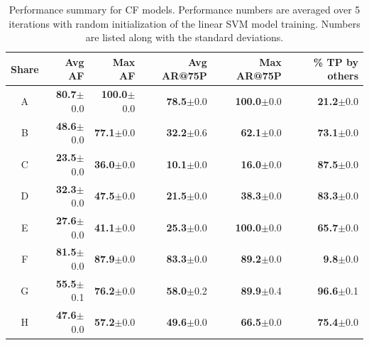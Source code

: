 \begin{table}[t!]
{\fontsize{8pt}{1em}\selectfont
\begin{center}
\caption{Performance summary for CF models. Performance
  numbers are averaged over 5 iterations with random
  initialization of the linear SVM model training. Numbers are listed
  along with the standard deviations.}
\begin{tabular}{|c|r|r|r|r|r|}
		\hline
		\textbf{Share} & \textbf{Avg AF} & \textbf{Max AF} & \textbf{Avg AR@75P} & \textbf{Max AR@75P} & \textbf{\% TP by others} \tabularnewline
		\hline
A&\textbf{80.7}$\pm$0.0&\textbf{100.0}$\pm$0.0&\textbf{78.5}$\pm$0.0&\textbf{100.0}$\pm$0.0&\textbf{21.2}$\pm$0.0\tabularnewline \hline
B&\textbf{48.6}$\pm$0.0&\textbf{77.1}$\pm$0.0&\textbf{32.2}$\pm$0.6&\textbf{62.1}$\pm$0.0&\textbf{73.1}$\pm$0.0\tabularnewline \hline
C&\textbf{23.5}$\pm$0.0&\textbf{36.0}$\pm$0.0&\textbf{10.1}$\pm$0.0&\textbf{16.0}$\pm$0.0&\textbf{87.5}$\pm$0.0\tabularnewline \hline
D&\textbf{32.3}$\pm$0.0&\textbf{47.5}$\pm$0.0&\textbf{21.5}$\pm$0.0&\textbf{38.3}$\pm$0.0&\textbf{83.3}$\pm$0.0\tabularnewline \hline
E&\textbf{27.6}$\pm$0.0&\textbf{41.1}$\pm$0.0&\textbf{25.3}$\pm$0.0&\textbf{100.0}$\pm$0.0&\textbf{65.7}$\pm$0.0\tabularnewline \hline
F&\textbf{81.5}$\pm$0.0&\textbf{87.9}$\pm$0.0&\textbf{83.3}$\pm$0.0&\textbf{89.2}$\pm$0.0&\textbf{9.8}$\pm$0.0\tabularnewline \hline
G&\textbf{55.5}$\pm$0.1&\textbf{76.2}$\pm$0.0&\textbf{58.0}$\pm$0.2&\textbf{89.9}$\pm$0.4&\textbf{96.6}$\pm$0.1\tabularnewline \hline
H&\textbf{47.6}$\pm$0.0&\textbf{57.2}$\pm$0.0&\textbf{49.6}$\pm$0.0&\textbf{66.5}$\pm$0.0&\textbf{75.4}$\pm$0.0\tabularnewline \hline
\end{tabular}
\end{center}
}

\label{tab:CollabFilteringPerf}  %
\end{table}

